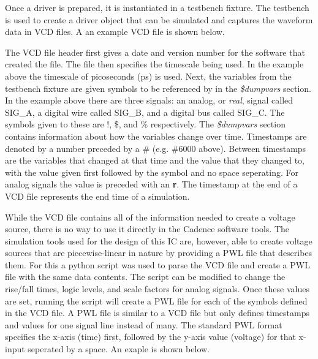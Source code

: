 \documentclass[12pt,oneside,final]{siuethesis}
\theoremstyle{definition}
\begin{document}
\par Once a driver is prepared, it is instantiated in a testbench fixture. The testbench is used to create a driver object that can be simulated and captures the waveform data in VCD files. A an example VCD file is shown below.
 
The VCD file header first gives a date and version number for the software that created the file. The file then specifies the timescale being used. In the example above the timescale of picoseconds (ps) is used. Next, the variables from the testbench fixture are given symbols to be referenced by in the \emph{\$dumpvars} section. In the example above there are three signals: an analog, or \emph{real}, signal called SIG\_A, a digital wire called SIG\_B, and a digital bus called SIG\_C. The symbols given to these are !, \$, and \% respectively. The \emph{\$dumpvars} section contains information about how the variables change over time. Timestamps are denoted by a number preceded by a \# (e.g. \#6000 above). Between timestamps are the variables that changed at that time and the value that they changed to, with the value given first followed by the symbol and no space seperating. For analog signals the value is preceded with an \textbf{r}. The timestamp at the end of a VCD file represents the end time of a simulation.
\par While the VCD file contains all of the information needed to create a voltage source, there is no way to use it directly in the Cadence software tools. The simulation tools used for the design of this IC are, however, able to create voltage sources that are piecewise-linear in nature by providing a PWL file that describes them. For this a python script was used to parse the VCD file and create a PWL file with the same data contents. The script can be modified to change the rise/fall times, logic levels, and scale factors for analog signals. Once these values are set, running the script will create a PWL file for each of the symbols defined in the VCD file. A PWL file is similar to a VCD file but only defines timestamps and values for one signal line instead of many. The standard PWL format specifies the x-axis (time) first, followed by the y-axis value (voltage) for that x-input seperated by a space. An exaple is shown below.
\end{document}
